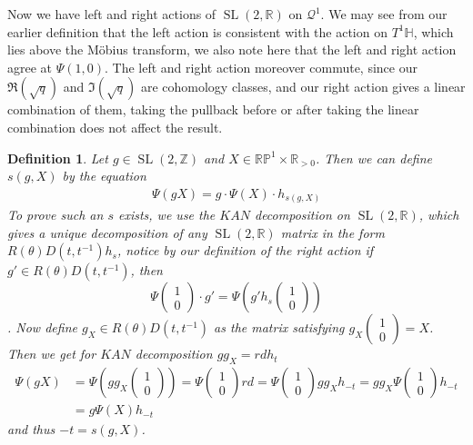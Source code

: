 \documentclass{article}
\newtheorem{defn}{Definition}
\newcommand{\slr}{\operatorname{SL}(2,\mathbb{R})}
\newcommand{\slz}{\operatorname{SL}(2,\mathbb{Z})}
\begin{document}
        Now we have left and right actions of \(\slr\) on \(\mathcal{Q}^1\). We may see from our earlier definition that the left action is consistent with the action on \(T^1 \mathbb{H}\), which lies above the M\"obius transform, we also note here that the left and right action agree at \(\Psi(1,0)\). The left and right action moreover commute, since our \(\Re(\sqrt{q})\) and \(\Im(\sqrt{q})\) are cohomology classes, and our right action gives a linear combination of them, taking the pullback before or after taking the linear combination does not affect the result.

        \begin{defn}
            Let \(g \in \slz\) and \(X \in \mathbb{RP}^1 \times \mathbb{R}_{>0}\). Then we can define \(s(g,X)\) by the equation
            \begin{align*}
                \Psi(g X) = g \cdot \Psi(X)\cdot h_{s(g,X)}
            \end{align*}
            To prove such an \(s\) exists, we use the \(KAN\) decomposition on \(\slr\), which gives a unique decomposition of any \(\slr\) matrix in the form \(R(\theta)D(t,t^{-1})h_s\), notice by our definition of the right action if \(g' \in R(\theta)D(t,t^{-1})\), then 
            \[\Psi \begin{pmatrix} 1 \\ 0 \end{pmatrix}\cdot g' = \Psi\left(g'h_s \begin{pmatrix} 1 \\ 0 \end{pmatrix}\right)\]. Now define \(g_X \in R(\theta)D(t,t^{-1})\) as the matrix satisfying \(g_X \begin{pmatrix} 1 \\ 0 \end{pmatrix} = X\). Then we get for \(KAN\) decomposition \(gg_X = rdh_t\)
            \begin{align*}
                \Psi(gX) &= \Psi\left(gg_X \begin{pmatrix} 1 \\ 0 \end{pmatrix}\right) = \Psi \begin{pmatrix} 1 \\ 0 \end{pmatrix} rd = \Psi \begin{pmatrix} 1 \\ 0 \end{pmatrix} gg_X h_{-t} = gg_X \Psi \begin{pmatrix} 1 \\ 0 \end{pmatrix} h_{-t} \\
                &= g\Psi(X)h_{-t}
            \end{align*}
            and thus \(-t = s(g,X)\).

        \end{defn}
\end{document}
